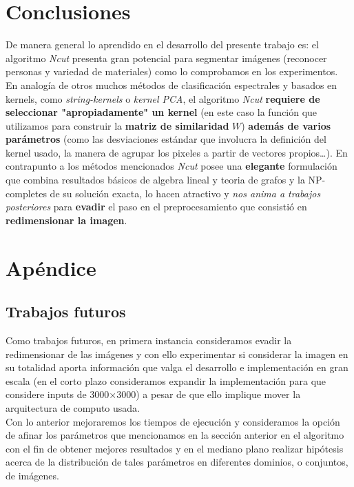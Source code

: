 \documentclass[conference]{IEEEtran}
\begin{document}
\section{Conclusiones}
De manera general lo aprendido en el desarrollo del presente trabajo es: el algoritmo \textit{Ncut} presenta gran potencial para segmentar imágenes (reconocer personas y variedad de materiales) como lo comprobamos en los experimentos. En analogía de otros muchos métodos de clasificación espectrales y basados en kernels, como \textit{string-kernels} o \textit{kernel PCA}, el algoritmo \textit{Ncut} \textbf{requiere de seleccionar "apropiadamente" un kernel} (en este caso la función que utilizamos para construir la \textbf{matriz de similaridad} $W$) \textbf{además de varios parámetros} (como las desviaciones estándar que involucra la definición del kernel usado, la manera de agrupar los pixeles a partir de vectores propios…). En contrapunto a los métodos mencionados \textit{Ncut} posee una \textbf{elegante} formulación que combina resultados básicos de algebra lineal y teoria de grafos y la NP-completes de su solución exacta, lo hacen atractivo y \textit{nos anima a trabajos posteriores} para \textbf{evadir} el paso en el preprocesamiento que consistió en \textbf{redimensionar la imagen}.



\section*{Apéndice}

\subsection*{Trabajos futuros}
Como trabajos futuros, en primera instancia consideramos evadir la redimensionar de las imágenes y con ello experimentar si considerar la imagen en su totalidad aporta información que valga el desarrollo e implementación en gran escala (en el corto plazo consideramos expandir la implementación para que considere inputs de 3000$\times$3000) a pesar de que ello implique mover la arquitectura de computo usada. \\
Con lo anterior mejoraremos los tiempos de ejecución y consideramos la opción de afinar los parámetros que mencionamos en la sección anterior en el algoritmo con el fin de obtener mejores resultados y en el mediano plano realizar hipótesis acerca de la distribución de tales parámetros en diferentes dominios, o conjuntos, de imágenes. 
\end{document}
